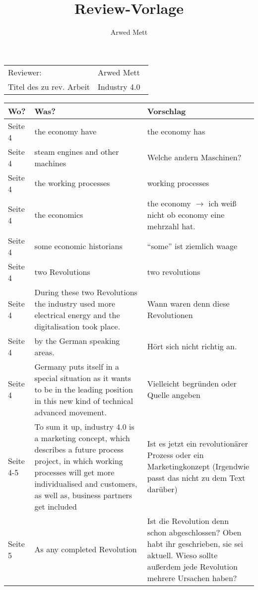 \documentclass{article}
\author{Arwed Mett}
\title{Review-Vorlage}
\begin{document}
\maketitle
\begin{center}
\begin{tabularx}{5cm}{ll}
    Reviewer: & Arwed Mett\\
    Titel des zu rev. Arbeit & Industry 4.0\
\end{tabularx}
\vspace{1cm}
\end{center}
\begin{tabularx}{\textwidth}{|l|X|X|}
    \hline
    \textbf{Wo?} & \textbf{Was?} & \textbf{Vorschlag}\\
    \hline
    Seite 4 & the economy have & the economy has\\
    \hline
    Seite 4 & steam engines and other machines & Welche andern Maschinen?\\
    \hline
    Seite 4 & the working processes & working processes\\
    \hline
    Seite 4 & the economics & the economy $\rightarrow$ ich weiß nicht ob economy eine mehrzahl hat.\\
    \hline
    Seite 4 & some economic historians & \enquote{some} ist ziemlich waage\\
    \hline
    Seite 4 & two Revolutions & two revolutions\\
    \hline
    Seite 4 &
    During these two Revolutions the industry used more electrical energy and
    the digitalisation took place. & Wann waren denn diese Revolutionen\\
    \hline
    Seite 4 & by the German speaking areas. & Hört sich nicht richtig an.\\
    \hline
    Seite 4 & Germany puts itself in a special situation as it wants to be in the
    leading position in this new kind of technical advanced movement. & Vielleicht begründen oder Quelle angeben\\
    \hline
    Seite 4-5 &
    To sum it up, industry 4.0 is a marketing concept, which describes a
    future process project, in which working processes will get more individualised and customers, as well as, business partners get included &
    Ist es jetzt ein revolutionärer Prozess oder ein Marketingkonzept (Irgendwie passt das nicht zu dem Text darüber)\\
    \hline
    Seite 5 & As any completed Revolution & Ist die Revolution denn schon abgeschlossen? Oben habt ihr geschrieben, sie sei aktuell. Wieso sollte außerdem jede Revolution mehrere Ursachen haben?\\

\end{tabularx}
\end{document}
